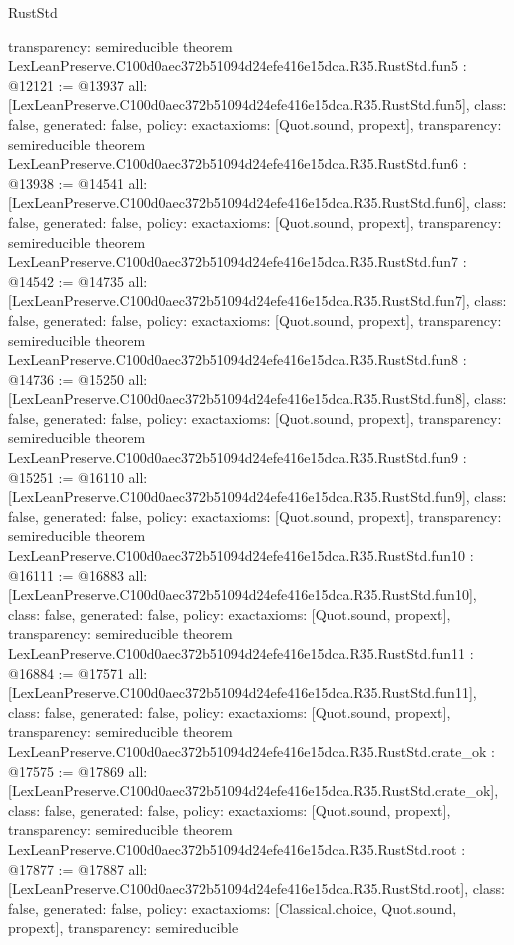 \begin{lexlean}{RustStd}
\begin{coremodule}
{  transparency: semireducible
}
theorem LexLeanPreserve.C100d0aec372b51094d24efe416e15dca.R35.RustStd.fun5 : @12121 := @13937 {
  all: [LexLeanPreserve.C100d0aec372b51094d24efe416e15dca.R35.RustStd.fun5],
  class: false,
  generated: false,
  policy: exact{axioms: [Quot.sound, propext]},
  transparency: semireducible
}
theorem LexLeanPreserve.C100d0aec372b51094d24efe416e15dca.R35.RustStd.fun6 : @13938 := @14541 {
  all: [LexLeanPreserve.C100d0aec372b51094d24efe416e15dca.R35.RustStd.fun6],
  class: false,
  generated: false,
  policy: exact{axioms: [Quot.sound, propext]},
  transparency: semireducible
}
theorem LexLeanPreserve.C100d0aec372b51094d24efe416e15dca.R35.RustStd.fun7 : @14542 := @14735 {
  all: [LexLeanPreserve.C100d0aec372b51094d24efe416e15dca.R35.RustStd.fun7],
  class: false,
  generated: false,
  policy: exact{axioms: [Quot.sound, propext]},
  transparency: semireducible
}
theorem LexLeanPreserve.C100d0aec372b51094d24efe416e15dca.R35.RustStd.fun8 : @14736 := @15250 {
  all: [LexLeanPreserve.C100d0aec372b51094d24efe416e15dca.R35.RustStd.fun8],
  class: false,
  generated: false,
  policy: exact{axioms: [Quot.sound, propext]},
  transparency: semireducible
}
theorem LexLeanPreserve.C100d0aec372b51094d24efe416e15dca.R35.RustStd.fun9 : @15251 := @16110 {
  all: [LexLeanPreserve.C100d0aec372b51094d24efe416e15dca.R35.RustStd.fun9],
  class: false,
  generated: false,
  policy: exact{axioms: [Quot.sound, propext]},
  transparency: semireducible
}
theorem LexLeanPreserve.C100d0aec372b51094d24efe416e15dca.R35.RustStd.fun10 : @16111 := @16883 {
  all: [LexLeanPreserve.C100d0aec372b51094d24efe416e15dca.R35.RustStd.fun10],
  class: false,
  generated: false,
  policy: exact{axioms: [Quot.sound, propext]},
  transparency: semireducible
}
theorem LexLeanPreserve.C100d0aec372b51094d24efe416e15dca.R35.RustStd.fun11 : @16884 := @17571 {
  all: [LexLeanPreserve.C100d0aec372b51094d24efe416e15dca.R35.RustStd.fun11],
  class: false,
  generated: false,
  policy: exact{axioms: [Quot.sound, propext]},
  transparency: semireducible
}
theorem LexLeanPreserve.C100d0aec372b51094d24efe416e15dca.R35.RustStd.crate_ok : @17575 := @17869 {
  all: [LexLeanPreserve.C100d0aec372b51094d24efe416e15dca.R35.RustStd.crate_ok],
  class: false,
  generated: false,
  policy: exact{axioms: [Quot.sound, propext]},
  transparency: semireducible
}
theorem LexLeanPreserve.C100d0aec372b51094d24efe416e15dca.R35.RustStd.root : @17877 := @17887 {
  all: [LexLeanPreserve.C100d0aec372b51094d24efe416e15dca.R35.RustStd.root],
  class: false,
  generated: false,
  policy: exact{axioms: [Classical.choice, Quot.sound, propext]},
  transparency: semireducible
}


\end{coremodule}
\end{lexlean}
